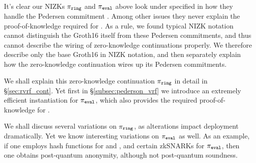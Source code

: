 It's clear our NIZKs $\pi_{\mathtt{ring}}$ and $\pi_{\mathtt{eval}}$ above look under specified
in how they handle the Pedersen commitment \compk.  Among other issues
they never explain the proof-of-knowledge required for \compk.
As a rule, we found typical NIZK notation cannot distinguish the Groth16
itself from these Pedersen commitments, and thus cannot describe the
wiring of zero-knowledge continuations properly.
We therefore describe only the base Groth16 in NIZK notation, and then
separately explain how the zero-knowledge continuation wires up its
Pedersen commitments.

We shall explain this zero-knowledge continuation $\pi_{\mathtt{ring}}$ in detail
in \S\ref{sec:rvrf_cont}.  Yet first in \S\ref{subsec:pederson_vrf}
we introduce an extremely efficient instantiation for $\pi_{\mathtt{eval}}$, which
also provides the required proof-of-knowledge for \compk.

We shall discuss several variations on $\pi_{\mathtt{ring}}$, as alterations impact
deployment dramatically.  Yet we know interesting variations on $\pi_{\mathtt{eval}}$
as well.  As an example, if one employs hash functions for \CommitKey
and \PRF, and certain zkSNARKs for $\pi_{\mathtt{eval}}$, then one obtains post-quantum
anonymity, although not post-quantum soundness.

